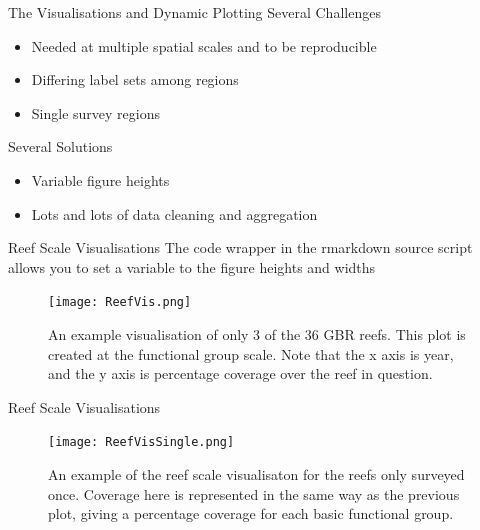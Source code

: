 \documentclass{beamer}
\begin{document}
              \begin{frame}{The Visualisations and Dynamic Plotting}
                Several Challenges
                  \begin{itemize}
                    \item Needed at multiple spatial scales and to be reproducible
                    \item Differing label sets among regions
                    \item Single survey regions
                  \end{itemize}

                  \medskip

                Several Solutions
                  \begin{itemize}
                    \item Variable figure heights
                    \item Lots and lots of data cleaning and aggregation
                  \end{itemize}
              \end{frame}

              \begin{frame}{Reef Scale Visualisations}
                The code wrapper in the rmarkdown source script allows you to set a variable to the figure heights and widths
                \begin{figure}
                    \centering
                    \texttt{[image: ReefVis.png]}
                    \caption{An example visualisation of only 3 of the 36 GBR reefs. This plot is created at the functional group scale. Note that the x axis is year, and the y axis is percentage coverage over the reef in question. }
                \end{figure}
             \end{frame}

             \begin{frame}{Reef Scale Visualisations}
                \begin{figure}
                    \centering
                    \texttt{[image: ReefVisSingle.png]}
                    \caption{An example of the reef scale visualisaton for the reefs only surveyed once. Coverage here is represented in the same way as the previous plot, giving a percentage coverage for each basic functional group.}
                \end{figure}
             \end{frame}
\end{document}
